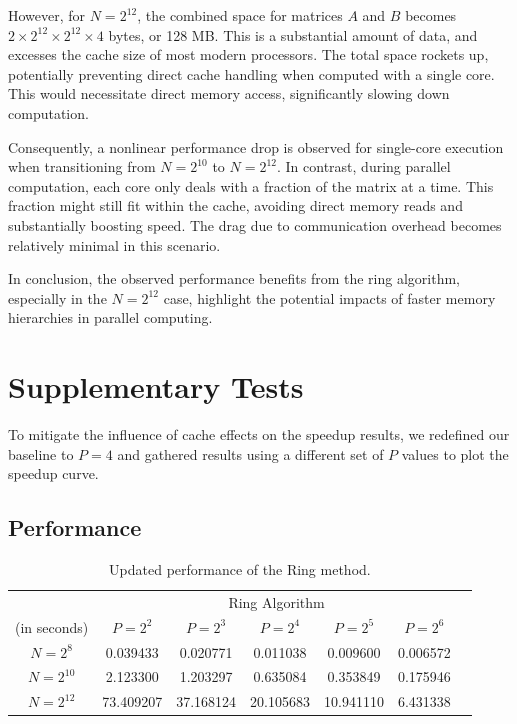 \documentclass[12pt,a4paper]{article}
\begin{document}
However, for \( N = 2^{12} \), the combined space for matrices \( A \) and \( B \) becomes 
 \( 2 \times 2^{12} \times 2^{12} \times 4 \) bytes, or 128 MB.
This is a substantial amount of data, and excesses the cache size of most modern processors.
The total space rockets up, potentially preventing direct cache handling when computed with a single core. 
This would necessitate direct memory access, 
 significantly slowing down computation. 

Consequently, a nonlinear performance drop is observed 
 for single-core execution when transitioning from \( N = 2^{10} \) to \( N = 2^{12} \). 
In contrast, during parallel computation, each core only deals with a fraction of the matrix at a time. 
This fraction might still fit within the cache, 
 avoiding direct memory reads and substantially boosting speed. 
The drag due to communication overhead becomes relatively minimal in this scenario.

In conclusion, the observed performance benefits from the ring algorithm, especially in the $N=2^{12}$
case, highlight the potential impacts of faster memory hierarchies in parallel computing.

\appendix
\label{app:myappendix}
\section{Supplementary Tests}
To mitigate the influence of cache effects on the speedup results, 
 we redefined our baseline to \( P=4 \) and gathered results 
 using a different set of \( P \) values to plot the speedup curve.

\subsection{Performance}
\begin{table}[h]
    \centering
    \begin{tabular}{ccccccc}
        \toprule
        & \multicolumn{5}{c}{Ring Algorithm} & \multicolumn{1}{c}{} \\
        \cmidrule(lr){2-6}
        (in seconds) & \( P = 2^2 \) & \( P = 2^3 \) & \( P = 2^4 \) & \( P = 2^5 \) & \( P = 2^6 \) \\
        \midrule
        \( N = 2^8 \)  & 0.039433 & 0.020771 & 0.011038 & 0.009600 & 0.006572 \\
        \( N = 2^{10} \) & 2.123300 & 1.203297 & 0.635084 & 0.353849 & 0.175946 \\
        \( N = 2^{12} \) & 73.409207 & 37.168124 & 20.105683 & 10.941110 & 6.431338 \\
        \bottomrule
    \end{tabular}
    \caption{Updated performance of the Ring method.}
    \label{tab:updated_results}
\end{table}
\end{document}
